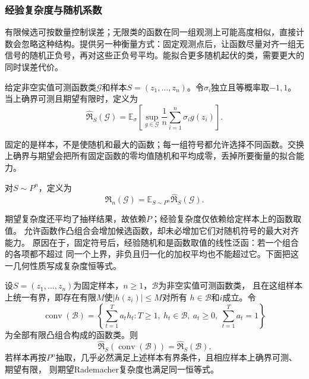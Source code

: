 \subsubsection{经验复杂度与随机系数}

有限候选可按数量控制误差；无限类的函数在同一组观测上可能高度相似，直接计数会忽略这种结构。提供另一种衡量方式：固定观测点后，让函数尽量对齐一组无信号的随机正负号，再对这些正负号平均。能拟合更多随机起伏的类，需要更大的同时误差代价。
\begin{definition}[经验Rademacher复杂度]
  \label{def:rademacher-complexity}
  给定非空实值可测函数类\(\mathcal G\)和样本\(S=(z_1,\ldots,z_n)\)。令\(\sigma_i\)独立且等概率取\(-1,1\)。当上确界可测且期望有限时，定义为
  \begin{equation}
    \widehat{\mathfrak R}_S(\mathcal G)
    =\mathbb E_\sigma\left[\sup_{g\in\mathcal G}\frac1n\sum_{i=1}^n\sigma_i g(z_i)\right].
    \label{eq:empirical-rademacher}
  \end{equation}
\end{definition}
固定的是样本，不是使随机和最大的函数；每一组符号都允许选择不同函数。交换上确界与期望会把所有固定函数的零均值随机和平均成零，丢掉所要衡量的拟合能力。
\begin{definition}[期望Rademacher复杂度]
  \label{def:expected-rademacher-complexity}
  对\(S\sim P^n\)，定义为
  \[
    \mathfrak R_n(\mathcal G)=\mathbb E_{S\sim P^n}\widehat{\mathfrak R}_S(\mathcal G).
  \]
\end{definition}
期望复杂度还平均了抽样结果，故依赖\(P\)；经验复杂度仅依赖给定样本上的函数取值。
允许函数作凸组合会增加候选函数，却未必增加它们对随机符号的最大对齐能力。
原因在于，固定符号后，经验随机和是函数取值的线性泛函：若一个组合的各项都不超过
同一个上界，非负且归一化的加权平均也不能超过它。下面把这一几何性质写成复杂度恒等式。

\begin{theorem}[凸组合的Rademacher复杂度]
\label{thm:ensemble-convex-hull}
设$S=(z_1,\ldots,z_n)$为固定样本，$n\geq1$，$\mathcal B$为非空实值可测函数类，
且在这组样本上统一有界，即存在有限$M$使$|h(z_i)|\leq M$对所有
$h\in\mathcal B$和$i$成立。令
\[
 \operatorname{conv}(\mathcal B)
 =\left\{\sum_{t=1}^T a_t h_t:
 T\geq1,\ h_t\in\mathcal B,\ a_t\geq0,\ \sum_{t=1}^T a_t=1\right\}
\]
为全部有限凸组合构成的函数类。则
\[
 \widehat{\mathfrak R}_S(\operatorname{conv}(\mathcal B))
 =\widehat{\mathfrak R}_S(\mathcal B).
\]
若样本再按$P^n$抽取，几乎必然满足上述样本有界条件，且相应样本上确界可测、期望有限，
则期望Rademacher复杂度也满足同一恒等式。
\end{theorem}


